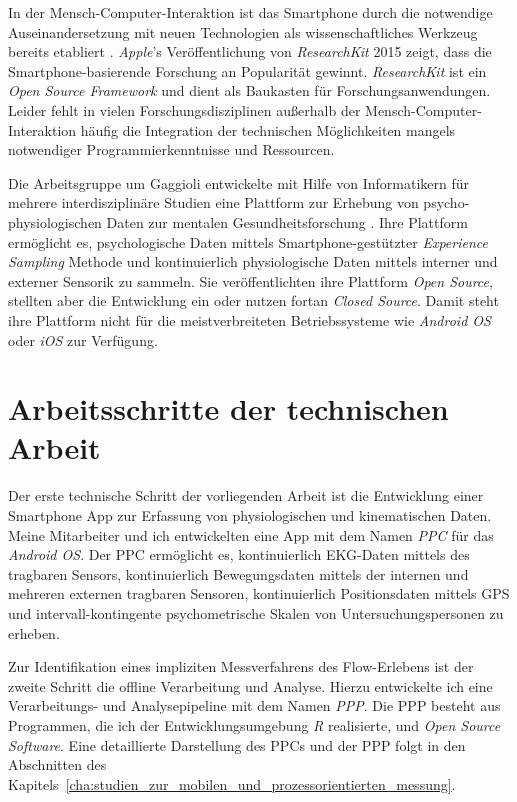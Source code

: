In der Mensch-Computer-Interaktion ist das Smartphone durch die notwendige Auseinandersetzung mit neuen Technologien als wissenschaftliches Werkzeug bereits etabliert \citep{Froehlich2007}. \emph{Apple}'s Veröffentlichung von \emph{ResearchKit} 2015 zeigt, dass die Smartphone-basierende Forschung an Popularität gewinnt. \emph{ResearchKit} ist ein \emph{Open Source Framework} und dient als Baukasten für Forschungsanwendungen. Leider fehlt in vielen Forschungsdisziplinen außerhalb der Mensch-Computer-Interaktion häufig die Integration der technischen Möglichkeiten mangels notwendiger Programmierkenntnisse und Ressourcen.

Die Arbeitsgruppe um Gaggioli entwickelte mit Hilfe von Informatikern für mehrere interdisziplinäre Studien eine Plattform zur Erhebung von psycho-physiologischen Daten zur mentalen Gesundheitsforschung \citep{Gaggioli2013}. Ihre Plattform ermöglicht es, psychologische Daten mittels Smartphone-gestützter \emph{Experience Sampling} Methode und kontinuierlich physiologische Daten mittels interner und externer Sensorik zu sammeln. Sie veröffentlichten ihre Plattform \emph{Open Source}, stellten aber die Entwicklung ein oder nutzen fortan \emph{Closed Source}. Damit steht ihre Plattform nicht für die meistverbreiteten Betriebssysteme wie \emph{Android OS} oder \emph{iOS} zur Verfügung.

\section{Arbeitsschritte der technischen Arbeit}
\label{sec:arbeitsschritte_der_technischen_arbeit}
Der erste technische Schritt der vorliegenden Arbeit ist die Entwicklung einer Smartphone App zur Erfassung von physiologischen und kinematischen Daten. Meine Mitarbeiter und ich entwickelten eine App mit dem Namen \emph{\ac{PPC}} für das \emph{Android OS}. Der \ac{PPC} ermöglicht es, kontinuierlich \ac{EKG}-Daten mittels des tragbaren Sensors, kontinuierlich Bewegungsdaten mittels der internen und mehreren externen tragbaren Sensoren, kontinuierlich Positionsdaten mittels \ac{GPS} und intervall-kontingente psychometrische Skalen von Untersuchungspersonen zu erheben.

Zur Identifikation eines impliziten Messverfahrens des Flow-Erlebens ist der zweite Schritt die offline Verarbeitung und Analyse. Hierzu entwickelte ich eine Verarbeitungs- und Analysepipeline mit dem Namen \emph{\ac{PPP}}. Die \ac{PPP} besteht aus Programmen, die ich der Entwicklungsumgebung \emph{R} realisierte, und \emph{Open Source Software}. Eine detaillierte Darstellung des \ac{PPC}s und der \ac{PPP} folgt in den Abschnitten des Kapitels~\ref{cha:studien_zur_mobilen_und_prozessorientierten_messung}.

